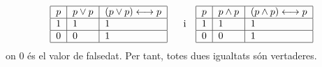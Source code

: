 \begin{solucio}
\begin{equation*}
\begin{tabular}{|l|l|l|}
\hline
$p$ & $p\vee p$ & $\left( p\vee p\right) \longleftrightarrow p$ \\ \hline
$1$ & $1$ & $1$ \\ \hline
$0$ & $0$ & $1$ \\ \hline
\end{tabular}%
\text{ \ \ i \ \ }%
\begin{tabular}{|l|l|l|}
\hline
$p$ & $p\wedge p$ & $\left( p\wedge p\right) \longleftrightarrow p$ \\ \hline
$1$ & $1$ & $1$ \\ \hline
$0$ & $0$ & $1$ \\ \hline
\end{tabular}%
\end{equation*}%
on $0$ \'{e}s el valor de falsedat. Per tant, totes dues igualtats s\'{o}n
vertaderes.


\end{solucio}
